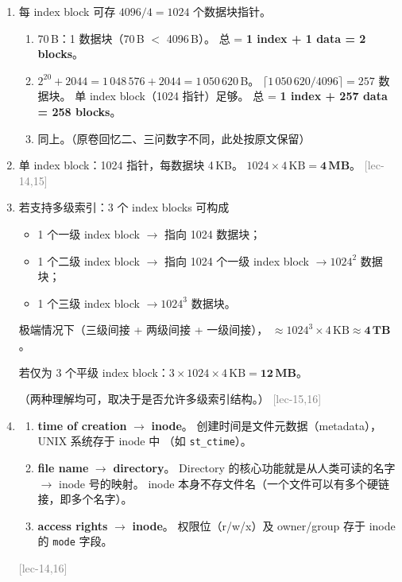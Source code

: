 \documentclass[11pt,a4paper]{article}
\newcommand{\lec}[1]{\textcolor{gray}{[lec-#1]}}
\begin{document}
\begin{enumerate}[label=(\alph*),leftmargin=*]

  \item 每 index block 可存 $4096/4 = 1024$ 个数据块指针。

        \begin{enumerate}[label=(\roman*)]
          \item 70\,B：1 数据块（70\,B $<$ 4096\,B）。
                总 = \textbf{1 index + 1 data = 2 blocks}。
          \item $2^{20}+2044 = 1\,048\,576 + 2044 = 1\,050\,620$\,B。
                $\lceil 1\,050\,620 / 4096 \rceil = 257$ 数据块。
                单 index block（1024 指针）足够。
                总 = \textbf{1 index + 257 data = 258 blocks}。
          \item 同上。（原卷回忆二、三问数字不同，此处按原文保留）
        \end{enumerate}

  \item 单 index block：1024 指针，每数据块 4\,KB。
        $1024 \times 4\,\text{KB} = \mathbf{4\,MB}$。 \lec{14,15}

  \item 若支持多级索引：3 个 index blocks 可构成
        \begin{itemize}[nosep]
          \item 1 个一级 index block $\to$ 指向 1024 数据块；
          \item 1 个二级 index block $\to$ 指向 1024 个一级 index block
                $\to 1024^2$ 数据块；
          \item 1 个三级 index block $\to 1024^3$ 数据块。
        \end{itemize}
        极端情况下（三级间接 + 两级间接 + 一级间接），
        $\approx 1024^3 \times 4\,\text{KB} \approx \mathbf{4\,TB}$。

        若仅为 3 个平级 index block：$3 \times 1024 \times 4\,\text{KB}
        = \mathbf{12\,MB}$。

        （两种理解均可，取决于是否允许多级索引结构。） \lec{15,16}

  \item
        \begin{enumerate}[label=(\roman*)]
          \item \textbf{time of creation} $\to$ \textbf{inode}。
                创建时间是文件元数据（metadata），UNIX 系统存于 inode 中
                （如 \texttt{st\_ctime}）。
          \item \textbf{file name} $\to$ \textbf{directory}。
                Directory 的核心功能就是从人类可读的名字 $\to$ inode 号的映射。
                inode 本身不存文件名（一个文件可以有多个硬链接，即多个名字）。
          \item \textbf{access rights} $\to$ \textbf{inode}。
                权限位（r/w/x）及 owner/group 存于 inode 的 \texttt{mode} 字段。
          \end{enumerate}
        \lec{14,16}


\end{enumerate}
\end{document}
